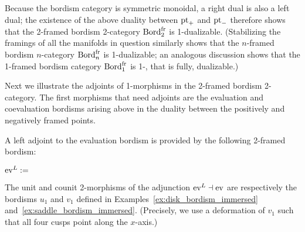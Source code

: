 \documentclass{amsart}
\begin{document}
Because the bordism category is symmetric monoidal, a right dual is also a left dual; the existence of the above duality between $\mathrm{pt}_+$ and $\mathrm{pt}_-$ therefore shows that the 2-framed bordism 2-category $\mathrm{Bord}^\mathrm{fr}_2$ is 1-dualizable.  (Stabilizing the framings of all the manifolds in question similarly shows that the $n$-framed bordism $n$-category $\mathrm{Bord}^\mathrm{fr}_n$ is 1-dualizable; an analogous discussion shows that the 1-framed bordism category $\mathrm{Bord}^\mathrm{fr}_1$ is 1-, that is fully, dualizable.)

Next we illustrate the adjoints of 1-morphisms in the 2-framed bordism 2-category.  The first morphisms that need adjoints are the evaluation and coevaluation bordisms arising above in the duality between the positively and negatively framed points.

\begin{example} \label{eg:evlevadj}
A left adjoint to the evaluation bordism is provided by the following 2-framed bordism:
\begin{center}
	$\mathrm{ev}^L := $ 
\end{center}
The unit and counit 2-morphisms of the adjunction $\mathrm{ev}^L \dashv \mathrm{ev}$ are respectively the bordisms $u_1$ and $v_1$ defined in Examples~\ref{ex:disk_bordism_immersed} and~\ref{ex:saddle_bordism_immersed}.  (Precisely, we use a deformation of $v_1$ such that all four cusps point along the $x$-axis.)
\end{example}
\end{document}
